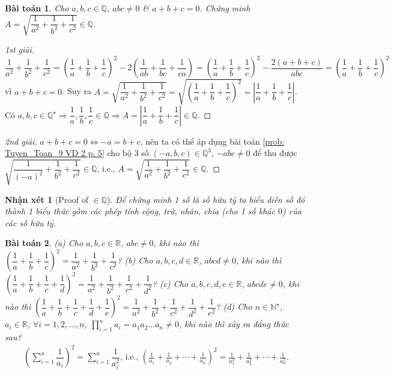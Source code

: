 \documentclass{article}
\newtheorem{baitoan}{Bài toán}
\newtheorem{nhanxet}{Nhận xét}
\begin{document}
\begin{baitoan}
	\label{prob: Mo rong Tuyen_Toan_9 VD 2 p. 5}
	Cho $a,b,c\in\mathbb{Q}$, $abc\ne0$ \& $a + b + c = 0$. Chứng minh $A = \sqrt{\dfrac{1}{a^2} + \dfrac{1}{b^2} + \dfrac{1}{c^2}}\in\mathbb{Q}$.
\end{baitoan}

\begin{proof}[1st giải]
	$\dfrac{1}{a^2} + \dfrac{1}{b^2} + \dfrac{1}{c^2} = \left(\dfrac{1}{a} + \dfrac{1}{b} + \dfrac{1}{c}\right)^2 - 2\left(\dfrac{1}{ab} + \dfrac{1}{bc} + \dfrac{1}{ca}\right) = \left(\dfrac{1}{a} + \dfrac{1}{b} + \dfrac{1}{c}\right)^2 - \dfrac{2(a + b + c)}{abc} = \left(\dfrac{1}{a} + \dfrac{1}{b} + \dfrac{1}{c}\right)^2$ vì $a + b + c = 0$. Suy ra $A = \sqrt{\dfrac{1}{a^2} + \dfrac{1}{b^2} + \dfrac{1}{c^2}} = \sqrt{\left(\dfrac{1}{a} + \dfrac{1}{b} + \dfrac{1}{c}\right)^2} = \left|\dfrac{1}{a} + \dfrac{1}{b} + \dfrac{1}{c}\right|$. Có $a,b,c\in\mathbb{Q}^\star\Rightarrow\dfrac{1}{a},\dfrac{1}{b},\dfrac{1}{c}\in\mathbb{Q}\Rightarrow A =\left|\dfrac{1}{a} + \dfrac{1}{b} + \dfrac{1}{c}\right|\in\mathbb{Q}$.
\end{proof}

\begin{proof}[2nd giải]
	$a + b + c = 0\Leftrightarrow -a = b + c$, nên ta có thể áp dụng bài toán \ref{prob: Tuyen_Toan_9 VD 2 p. 5} cho bộ 3 số $(-a,b,c)\in\mathbb{Q}^3$, $-abc\ne0$ để thu được $\sqrt{\dfrac{1}{(-a)^2} + \dfrac{1}{b^2} + \dfrac{1}{c^2}}\in\mathbb{Q}$, i.e., $A = \sqrt{\dfrac{1}{a^2} + \dfrac{1}{b^2} + \dfrac{1}{c^2}}\in\mathbb{Q}$.
\end{proof}

\begin{nhanxet}[Proof of $\in\mathbb{Q}$]
	Để chứng minh 1 số là số hữu tỷ ta biểu diễn số đó thành 1 biểu thức gồm các phép tính cộng, trừ, nhân, chia (cho 1 số khác $0$) của các số hữu tỷ.
\end{nhanxet}

\begin{baitoan}
	(a) Cho $a,b,c\in\mathbb{R}$, $abc\ne0$, khi nào thì $\left(\dfrac{1}{a} + \dfrac{1}{b} + \dfrac{1}{c}\right)^2 = \dfrac{1}{a^2} + \dfrac{1}{b^2} + \dfrac{1}{c^2}$? (b) Cho $a,b,c,d\in\mathbb{R}$, $abcd\ne0$, khi nào thì $\left(\dfrac{1}{a} + \dfrac{1}{b} + \dfrac{1}{c} + \dfrac{1}{d}\right)^2 = \dfrac{1}{a^2} + \dfrac{1}{b^2} + \dfrac{1}{c^2} + \dfrac{1}{d^2}$? (c) Cho $a,b,c,d,e\in\mathbb{R}$, $abcde\ne0$, khi nào thì $\left(\dfrac{1}{a} + \dfrac{1}{b} + \dfrac{1}{c} + \dfrac{1}{d} + \dfrac{1}{e}\right)^2 = \dfrac{1}{a^2} + \dfrac{1}{b^2} + \dfrac{1}{c^2} + \dfrac{1}{d^2} + \dfrac{1}{e^2}$? (d) Cho $n\in\mathbb{N}^\star$, $a_i\in\mathbb{R}$, $\forall i = 1,2,\ldots,n$, $\prod_{i=1}^n a_i = a_1a_2\ldots a_n\ne0$, khi nào thì xảy ra đẳng thức sau?
	\begin{align*}
		\left(\sum_{i=1}^n \dfrac{1}{a_i}\right)^2 = \sum_{i=1}^n \dfrac{1}{a_i^2}\mbox{, i.e., } \left(\frac{1}{a_1} + \frac{1}{a_2} + \cdots + \frac{1}{a_n}\right)^2 = \frac{1}{a_1^2} + \frac{1}{a_2^2} + \cdots + \frac{1}{a_n^2}.
	\end{align*}
\end{baitoan}
\end{document}

